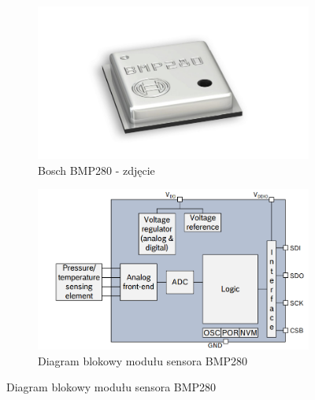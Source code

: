 \documentclass[11pt, a4paper]{article}
\begin{document}
\begin{figure}[h]
\centering
\begin{subfigure}{.5\textwidth}
\centering
\includegraphics[width=\linewidth]{fig/GY-BM280/bmp280_photo.PNG}
\caption{Bosch BMP280 - zdjęcie}
\label{fig:_zdjecie_elementu}
\end{subfigure}%
\begin{subfigure}{.5\textwidth}
\centering
\includegraphics[width=\linewidth]{fig/GY-BM280/bmp280_diagram.PNG}
\caption{\centering Diagram blokowy modułu sensora BMP280}
\label{fig:_zasada_dzialania_elementu}
\end{subfigure}
\label{fig:element}
\end{figure}
\vspace{0.25cm}
\end{document}
